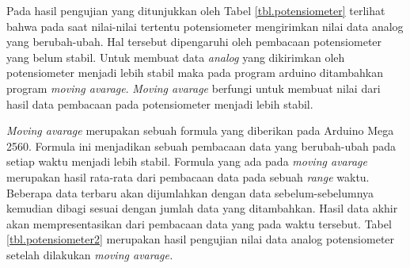 Pada hasil pengujian yang ditunjukkan oleh Tabel \ref{tbl.potensiometer} terlihat bahwa pada saat nilai-nilai tertentu potensiometer  mengirimkan nilai data analog yang berubah-ubah. Hal tersebut dipengaruhi oleh pembacaan potensiometer yang belum stabil. Untuk membuat data \textit{analog} yang dikirimkan oleh potensiometer menjadi lebih stabil maka pada program arduino ditambahkan program \textit{moving avarage}. \textit{Moving avarage} berfungi untuk membuat nilai dari hasil data pembacaan pada potensiometer menjadi lebih stabil. 

\textit{Moving avarage} merupakan sebuah formula yang diberikan pada Arduino Mega 2560.  Formula ini menjadikan sebuah pembacaan data yang berubah-ubah pada setiap waktu menjadi lebih stabil. Formula yang ada pada \textit{moving avarage} merupakan hasil rata-rata dari pembacaan data pada sebuah \textit{range} waktu. Beberapa data terbaru akan dijumlahkan dengan data sebelum-sebelumnya kemudian dibagi sesuai dengan jumlah data yang ditambahkan. Hasil data akhir akan mempresentasikan dari pembacaan data yang pada waktu tersebut. Tabel \ref{tbl.potensiometer2} merupakan hasil pengujian nilai data analog potensiometer setelah dilakukan \textit{moving avarage.}

